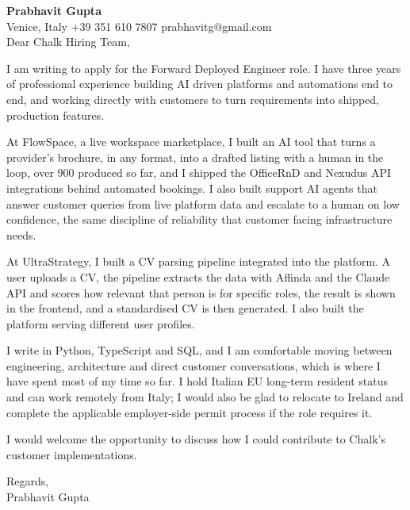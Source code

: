 \documentclass[a4paper,10.5pt]{article}
\begin{document}
\textbf{Prabhavit Gupta}\\
Venice, Italy \textbar{} +39 351 610 7807 \textbar{} prabhavitg@gmail.com\\[10pt]
Dear Chalk Hiring Team,

I am writing to apply for the Forward Deployed Engineer role. I have three years of professional experience building AI driven platforms and automations end to end, and working directly with customers to turn requirements into shipped, production features.

At FlowSpace, a live workspace marketplace, I built an AI tool that turns a provider's brochure, in any format, into a drafted listing with a human in the loop, over 900 produced so far, and I shipped the OfficeRnD and Nexudus API integrations behind automated bookings. I also built support AI agents that answer customer queries from live platform data and escalate to a human on low confidence, the same discipline of reliability that customer facing infrastructure needs.

At UltraStrategy, I built a CV parsing pipeline integrated into the platform. A user uploads a CV, the pipeline extracts the data with Affinda and the Claude API and scores how relevant that person is for specific roles, the result is shown in the frontend, and a standardised CV is then generated. I also built the platform serving different user profiles.

I write in Python, TypeScript and SQL, and I am comfortable moving between engineering, architecture and direct customer conversations, which is where I have spent most of my time so far. I hold Italian EU long-term resident status and can work remotely from Italy; I would also be glad to relocate to Ireland and complete the applicable employer-side permit process if the role requires it.

I would welcome the opportunity to discuss how I could contribute to Chalk's customer implementations.

Regards,\\
Prabhavit Gupta
\end{document}
